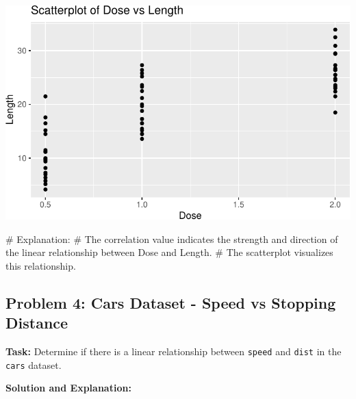 \documentclass[
  letterpaper,
  DIV=11,
  numbers=noendperiod]{scrreprt}
\newenvironment{Shaded}{\begin{snugshade}}{\end{snugshade}}
\newcommand{\CommentTok}[1]{\textcolor[rgb]{0.37,0.37,0.37}{#1}}
\newcommand{\FunctionTok}[1]{\textcolor[rgb]{0.28,0.35,0.67}{#1}}
\newcommand{\NormalTok}[1]{\textcolor[rgb]{0.00,0.23,0.31}{#1}}
\newcommand{\OtherTok}[1]{\textcolor[rgb]{0.00,0.23,0.31}{#1}}
\newcommand{\SpecialCharTok}[1]{\textcolor[rgb]{0.37,0.37,0.37}{#1}}
\begin{document}
\includegraphics{Scatterplots_and_Correlation_files/figure-pdf/unnamed-chunk-8-1.pdf}

\begin{Shaded}
\begin{Highlighting}[]
\CommentTok{\# Explanation:}
\CommentTok{\# The correlation value indicates the strength and direction of the linear relationship between Dose and Length.}
\CommentTok{\# The scatterplot visualizes this relationship.}
\end{Highlighting}
\end{Shaded}

\subsection*{Problem 4: Cars Dataset - Speed vs Stopping
Distance}\label{problem-4-cars-dataset---speed-vs-stopping-distance}

\textbf{Task:} Determine if there is a linear relationship between
\texttt{speed} and \texttt{dist} in the \texttt{cars} dataset.

\textbf{Solution and Explanation:}

\begin{Shaded}
\end{Shaded}
\end{document}
